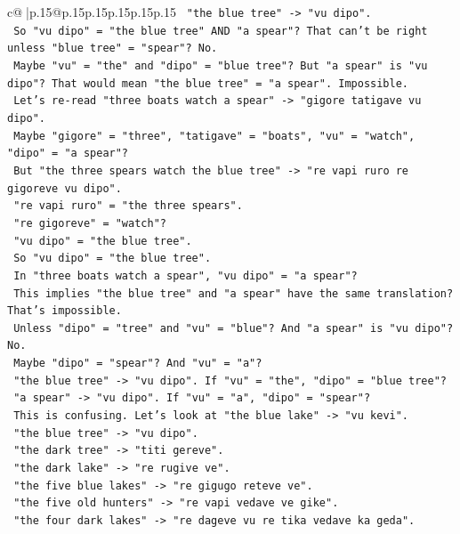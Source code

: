 \documentclass{article}
\begin{document}
{\begin{supertabular}{c@{$\;$}|p{.15\linewidth}@{}p{.15\linewidth}p{.15\linewidth}p{.15\linewidth}p{.15\linewidth}p{.15\linewidth}}
{{{\texttt{    "the blue tree" {-}> "vu dipo".} \\
\texttt{    So "vu dipo" = "the blue tree" AND "a spear"? That can't be right unless "blue tree" = "spear"? No.} \\
\texttt{    Maybe "vu" = "the" and "dipo" = "blue tree"? But "a spear" is "vu dipo"? That would mean "the blue tree" = "a spear". Impossible.} \\
\texttt{    Let's re{-}read "three boats watch a spear" {-}> "gigore tatigave vu dipo".} \\
\texttt{    Maybe "gigore" = "three", "tatigave" = "boats", "vu" = "watch", "dipo" = "a spear"?} \\
\texttt{    But "the three spears watch the blue tree" {-}> "re vapi ruro re gigoreve vu dipo".} \\
\texttt{    "re vapi ruro" = "the three spears".} \\
\texttt{    "re gigoreve" = "watch"?} \\
\texttt{    "vu dipo" = "the blue tree".} \\
\texttt{    So "vu dipo" = "the blue tree".} \\
\texttt{    In "three boats watch a spear", "vu dipo" = "a spear"?} \\
\texttt{    This implies "the blue tree" and "a spear" have the same translation? That's impossible.} \\
\texttt{    Unless "dipo" = "tree" and "vu" = "blue"? And "a spear" is "vu dipo"? No.} \\
\texttt{    Maybe "dipo" = "spear"? And "vu" = "a"?} \\
\texttt{    "the blue tree" {-}> "vu dipo". If "vu" = "the", "dipo" = "blue tree"?} \\
\texttt{    "a spear" {-}> "vu dipo". If "vu" = "a", "dipo" = "spear"?} \\
\texttt{    This is confusing. Let's look at "the blue lake" {-}> "vu kevi".} \\
\texttt{    "the blue tree" {-}> "vu dipo".} \\
\texttt{    "the dark tree" {-}> "titi gereve".} \\
\texttt{    "the dark lake" {-}> "re rugive ve".} \\
\texttt{    "the five blue lakes" {-}> "re gigugo reteve ve".} \\
\texttt{    "the five old hunters" {-}> "re vapi vedave ve gike".} \\
\texttt{    "the four dark lakes" {-}> "re dageve vu re tika vedave ka geda".} \\
}}}
\end{supertabular}}
\end{document}
